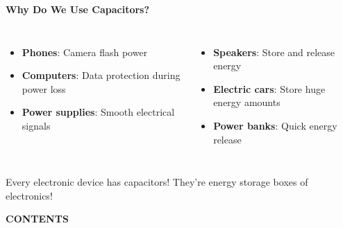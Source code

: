 \begin{frame}
\begin{frame}{\textbf{Why Do We Use Capacitors?}}

\begin{keybox}
\end{keybox}

\vspace{0.1cm}

\begin{columns}[T]
    \begin{itemize}[<+->]
        \item \textbf{Phones}: Camera flash power
        \item \textbf{Computers}: Data protection during power loss
        \item \textbf{Power supplies}: Smooth electrical signals
    \end{itemize}
    
    \begin{itemize}[<+->]
        \item \textbf{Speakers}: Store and release energy
        \item \textbf{Electric cars}: Store huge energy amounts
        \item \textbf{Power banks}: Quick energy release
    \end{itemize}
\end{columns}

\vspace{0.3cm}

\begin{importantbox}
Every electronic device has capacitors! They're energy storage boxes of electronics!
\end{importantbox}
\end{frame}


\begin{frame}[plain]
    \centering
    {\Huge\color{red!90}\textbf{CONTENTS}}
    
    \vspace{0.8cm}
    

\end{frame}
\end{frame}
